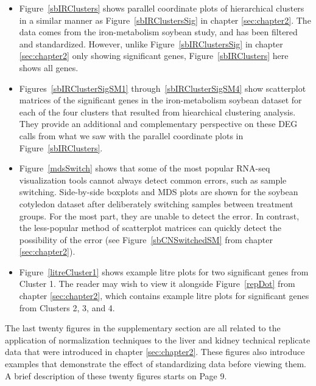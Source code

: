 \documentclass[11pt,a4paper,oldfontcommands,openany]{memoir}
\numberwithin{equation}{section} %
\begin{document}
\begin{itemize}

\item Figure~\ref{sbIRClusters} shows parallel coordinate plots of hierarchical clusters in a similar manner as Figure~\ref{sbIRClustersSig} in chapter \ref{sec:chapter2}. The data comes from the iron-metabolism soybean study, and has been filtered and standardized. However, unlike Figure~\ref{sbIRClustersSig} in chapter \ref{sec:chapter2} only showing significant genes, Figure~\ref{sbIRClusters} here shows all genes.

\item Figures~\ref{sbIRClusterSigSM1} through~\ref{sbIRClusterSigSM4} show scatterplot matrices of the significant genes in the iron-metabolism soybean dataset for each of the four clusters that resulted from hiearchical clustering analysis. They provide an additional and complementary perspective on these DEG calls from what we saw with the parallel coordinate plots in Figure~\ref{sbIRClusters}. 

\item Figure~\ref{mdsSwitch} shows that some of the most popular RNA-seq visualization tools cannot always detect common errors, such as sample switching. Side-by-side boxplots and MDS plots are shown for the soybean cotyledon dataset after deliberately switching samples between treatment groups. For the most part, they are unable to detect the error. In contrast, the less-popular method of scatterplot matrices can quickly detect the possibility of the error (see Figure~\ref{sbCNSwitchedSM} from chapter \ref{sec:chapter2}).

\item Figure~\ref{litreCluster1} shows example litre plots for two significant genes from Cluster 1. The reader may wish to view it alongside Figure~\ref{repDot} from chapter \ref{sec:chapter2}, which contains example litre plots for significant genes from Clusters 2, 3, and 4.

\end{itemize}

The last twenty figures in the supplementary section are all related to the application of normalization techniques to the liver and kidney technical replicate data that were introduced in chapter \ref{sec:chapter2}. These figures also introduce examples that demonstrate the effect of standardizing data before viewing them. A brief description of these twenty figures starts on Page 9.
\end{document}
